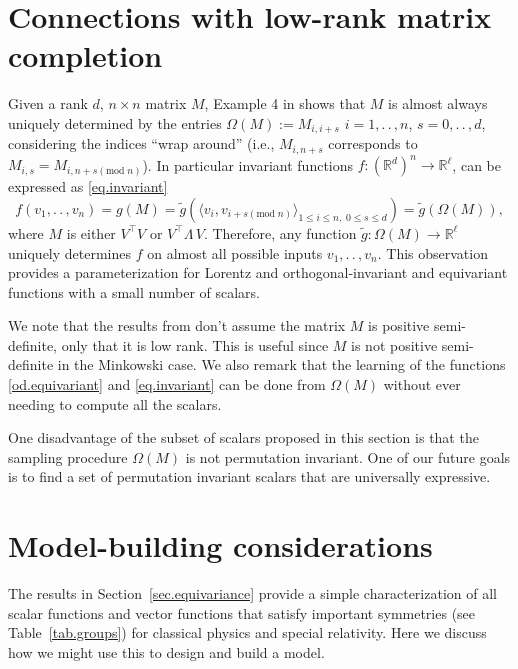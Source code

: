 \documentclass{article}
\theoremstyle{Hogg}
\newcommand{\inner}[2]{\langle{#1},{#2}\rangle}
\renewcommand{\ldots}{.\,.\,}
\begin{document}
\section{Connections with low-rank matrix completion} \label{app.matrix.completion}
Given a rank $d$, $n\times n$ matrix $M$, Example 4 in \cite{pimentel2016characterization} shows that $M$ is almost always uniquely determined by the entries $\Omega(M):=M_{i,i+s}$ $i=1,\ldots, n$, $s=0,\ldots ,d$, considering the indices ``wrap around'' (i.e., $M_{i,n+s}$ corresponds to $M_{i,s}=M_{i,n+s(\mathrm{mod }\; n)}$). 
In particular invariant functions $f:(\mathbb R^d)^n\to \mathbb R^\ell$, can be expressed as \eqref{eq.invariant}
\begin{equation}
    f(v_1,\ldots, v_n) = g ( M) = \tilde g(\inner{v_{i}}{v_{i+s  (\mathrm{mod}\; n) }}_{ 1\leq i\leq n,\; 0\leq s \leq d}) =\tilde g( \Omega(M)),
\end{equation}
where $M$ is either $V^\top V$ or $V^\top\Lambda\, V$.
Therefore, any function $\tilde g: \Omega(M) \to \mathbb R^\ell$ uniquely determines $f$ on almost all possible inputs $v_1,\ldots, v_n$. This observation provides a parameterization for Lorentz and orthogonal-invariant and equivariant functions with a small number of scalars. 

We note that the results from \cite{pimentel2016characterization} don't assume the matrix $M$ is positive semi-definite, only that it is low rank. This is useful since $M$ is not positive semi-definite in the Minkowski case. 
We also remark that the learning of the functions  \eqref{od.equivariant} and \eqref{eq.invariant} can be done from $\Omega(M)$ without ever needing to compute all the scalars.

One disadvantage of the subset of scalars proposed in this section is that the sampling procedure $\Omega(M)$ is not permutation invariant. One of our future goals is to find a set of permutation invariant scalars that are universally expressive.


\section{Model-building considerations}\label{app.model}

The results in Section~\ref{sec.equivariance} provide a simple characterization of all scalar functions and vector functions that satisfy important symmetries (see Table~\ref{tab.groups}) for classical physics and special relativity.
Here we discuss how we might use this to design and build a model.
\end{document}
